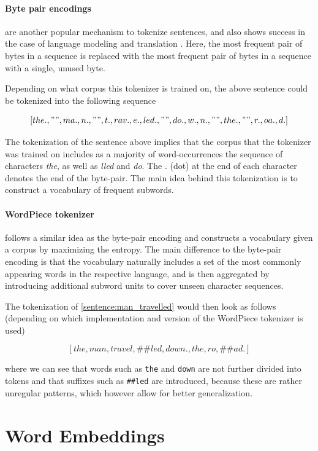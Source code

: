 \documentclass[a4paper,12pt,twoside,openright]{report}
\begin{document}
\paragraph{Byte pair encodings} \cite{gage94} are another popular mechanism to tokenize sentences, and also shows success in the case of language modeling and translation \cite{sennrich16}. 
Here, the most frequent pair of bytes in a sequence is replaced with the most frequent pair of bytes in a sequence with a single, unused byte.

Depending on what corpus this tokenizer is trained on, the above sentence could be tokenized into the following sequence

$$
[the., " ", ma., n., " ", t., rav., e., led., " ", do., w., n., " ", the., " ", r., oa., d.]
$$

The tokenization of the sentence above implies that the corpus that the tokenizer was trained on includes as a majority of word-occurrences the sequence of characters \textit{the}, as well as \textit{lled} and \textit{do}. 
The $.$ (dot) at the end of each character denotes the end of the byte-pair.
The main idea behind this tokenization is to construct a vocabulary of frequent subwords.

\paragraph{WordPiece tokenizer} \cite{wu16} follows a similar idea as the byte-pair encoding and constructs a vocabulary given a corpus by maximizing the entropy.
The main difference to the byte-pair encoding is that the vocabulary naturally includes a set of the most commonly appearing words in the respective language, and is then aggregated by introducing additional subword units to cover unseen character sequences.

The tokenization of \eqref{sentence:man_travelled} would then look as follows (depending on which implementation and version of the WordPiece tokenizer is used)

$$
[the, man, travel, \#\#led, down., the, ro,  \#\#ad.]
$$

where we can see that words such as \Verb#the# and \Verb#down# are not further divided into tokens and that suffixes such as \Verb!##led! are introduced, because these are rather unregular patterns, which however allow for better generalization.






\section{Word Embeddings}
\end{document}
